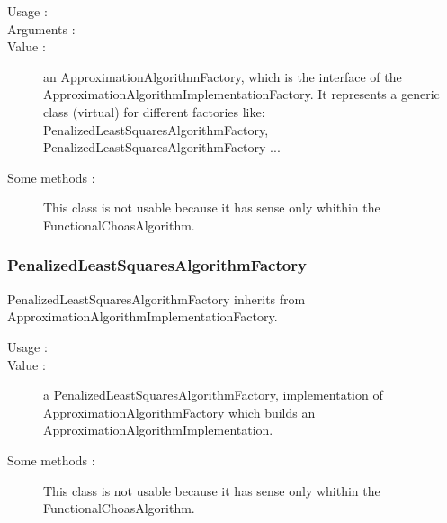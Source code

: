       \begin{description}
         \item[Usage :] \rule{0pt}{1em}

         \item[Arguments :] \rule{0pt}{1em}


         \item[Value :] an ApproximationAlgorithmFactory, which is the interface of the ApproximationAlgorithmImplementationFactory. It represents a generic class (virtual) for different factories like: PenalizedLeastSquaresAlgorithmFactory, PenalizedLeastSquaresAlgorithmFactory ...

         \item[Some methods :] This class is not usable because it has sense only whithin the FunctionalChoasAlgorithm.

      \end{description}


\newpage \subsubsection{PenalizedLeastSquaresAlgorithmFactory}

      PenalizedLeastSquaresAlgorithmFactory inherits from ApproximationAlgorithmImplementationFactory.

      \begin{description}
         \item[Usage :] \rule{0pt}{1em}

         \item[Value :] a PenalizedLeastSquaresAlgorithmFactory, implementation of ApproximationAlgorithmFactory which builds an ApproximationAlgorithmImplementation.

         \item[Some methods :]  This class is not usable because it has sense only whithin the FunctionalChoasAlgorithm.

      \end{description}


